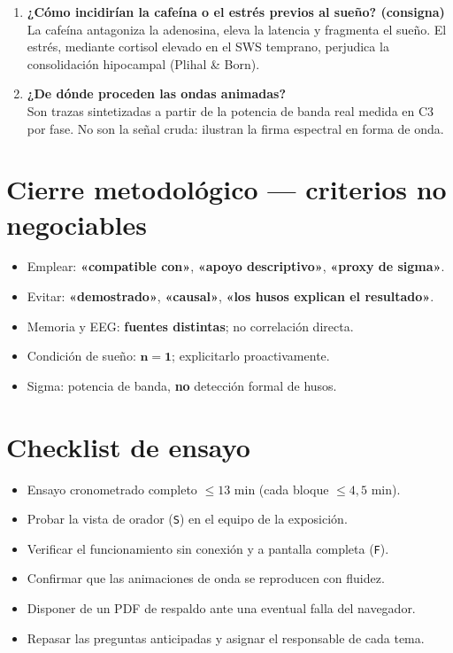 \documentclass[11pt,a4paper]{article}
\begin{document}
\begin{enumerate}[label=\textbf{\arabic*.},leftmargin=2em]
\item \textbf{¿Cómo incidirían la cafeína o el estrés previos al sueño? (consigna)}\\
La cafeína antagoniza la adenosina, eleva la latencia y fragmenta el sueño. El estrés, mediante cortisol
elevado en el SWS temprano, perjudica la consolidación hipocampal (Plihal \& Born).

\item \textbf{¿De dónde proceden las ondas animadas?}\\
Son trazas sintetizadas a partir de la potencia de banda real medida en C3 por fase. No son la señal
cruda: ilustran la firma espectral en forma de onda.
\end{enumerate}

\section{Cierre metodológico — criterios no negociables}

\begin{itemize}[leftmargin=1.5em]
\item Emplear: \textbf{«compatible con»}, \textbf{«apoyo descriptivo»}, \textbf{«proxy de sigma»}.
\item Evitar: \textbf{«demostrado»}, \textbf{«causal»}, \textbf{«los husos explican el resultado»}.
\item Memoria y EEG: \textbf{fuentes distintas}; no correlación directa.
\item Condición de sueño: $\mathbf{n=1}$; explicitarlo proactivamente.
\item Sigma: potencia de banda, \textbf{no} detección formal de husos.
\end{itemize}

\section{Checklist de ensayo}

\begin{itemize}[leftmargin=1.5em]
\item[$\square$] Ensayo cronometrado completo $\leq 13$ min (cada bloque $\leq 4{,}5$ min).
\item[$\square$] Probar la vista de orador (\texttt{S}) en el equipo de la exposición.
\item[$\square$] Verificar el funcionamiento sin conexión y a pantalla completa (\texttt{F}).
\item[$\square$] Confirmar que las animaciones de onda se reproducen con fluidez.
\item[$\square$] Disponer de un PDF de respaldo ante una eventual falla del navegador.
\item[$\square$] Repasar las preguntas anticipadas y asignar el responsable de cada tema.
\end{itemize}
\end{document}
